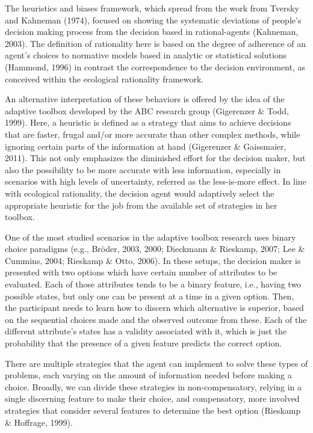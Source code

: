 \documentclass[
  english,
  man]{apa6}
\begin{document}
The heuristics and biases framework, which spread from the work from Tversky and Kahneman (1974), focused on showing the systematic deviations of people's decision making process from the decision based in rational-agents (Kahneman, 2003). The definition of rationality here is based on the degree of adherence of an agent's choices to normative models based in analytic or statistical solutions (Hammond, 1996) in contrast the correspondence to the decision environment, as conceived within the ecological rationality framework.

An alternative interpretation of these behaviors is offered by the idea of the adaptive toolbox developed by the ABC research group (Gigerenzer \& Todd, 1999). Here, a heuristic is defined as a strategy that aims to achieve decisions that are faster, frugal and/or more accurate than other complex methods, while ignoring certain parts of the information at hand (Gigerenzer \& Gaissmaier, 2011). This not only emphasizes the diminished effort for the decision maker, but also the possibility to be more accurate with less information, especially in scenarios with high levels of uncertainty, referred as the less-is-more effect. In line with ecological rationality, the decision agent would adaptively select the appropriate heuristic for the job from the available set of strategies in her toolbox.

One of the most studied scenarios in the adaptive toolbox research uses binary choice paradigms (e.g., Bröder, 2003, 2000; Dieckmann \& Rieskamp, 2007; Lee \& Cummins, 2004; Rieskamp \& Otto, 2006). In these setups, the decision maker is presented with two options which have certain number of attributes to be evaluated. Each of those attributes tends to be a binary feature, i.e., having two possible states, but only one can be present at a time in a given option. Then, the participant needs to learn how to discern which alternative is superior, based on the sequential choices made and the observed outcome from these. Each of the different attribute's states has a validity associated with it, which is just the probability that the presence of a given feature predicts the correct option.

There are multiple strategies that the agent can implement to solve these types of problems, each varying on the amount of information needed before making a choice. Broadly, we can divide these strategies in non-compensatory, relying in a single discerning feature to make their choice, and compensatory, more involved strategies that consider several features to determine the best option (Rieskamp \& Hoffrage, 1999).
\end{document}
